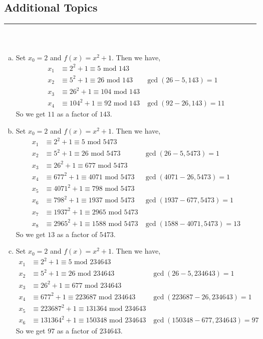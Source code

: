 \documentclass[class=article, crop=false]{standalone}
\begin{document}
\setcounter{subsection}{11}
\subsection{Additional Topics}
\rule{\textwidth}{1pt}\\
\subsubsection{}
\begin{enumerate}[(a)]
  \item
    Set $x_0 = 2$ and $f(x) =x^2+1$. Then we have,
    \begin{align*}
      x_1 &\equiv 2^2 + 1\equiv 5\mbox{ mod }143 \\
      x_2 &\equiv 5^2 + 1\equiv 26\mbox{ mod }143 &\gcd(26-5, 143)=1\\
      x_3 &\equiv 26^2 + 1\equiv 104\mbox{ mod }143 \\
      x_4 &\equiv 104^2 + 1\equiv 92\mbox{ mod }143 &\gcd(92-26, 143)=11
    \end{align*}
    So we get $11$ as a factor of $143$.

  \item
    Set $x_0=2$ and $f(x) = x^2+1$. Then we have,
    \begin{align*}
      x_1 &\equiv 2^2 + 1\equiv 5\mbox{ mod }5473 \\
      x_2 &\equiv 5^2 + 1\equiv 26\mbox{ mod }5473 &\gcd(26-5, 5473)=1\\
      x_3 &\equiv 26^2 + 1\equiv 677\mbox{ mod }5473 \\
      x_4 &\equiv 677^2 + 1\equiv 4071\mbox{ mod }5473 &\gcd(4071-26, 5473)=1\\
      x_5 &\equiv 4071^2 + 1\equiv 798\mbox{ mod }5473 \\
      x_6 &\equiv 798^2 + 1\equiv 1937\mbox{ mod }5473 &\gcd(1937-677, 5473)=1\\
      x_7 &\equiv 1937^2 + 1\equiv 2965\mbox{ mod }5473 \\
      x_8 &\equiv 2965^2 + 1\equiv 1588\mbox{ mod }5473 &\gcd(1588-4071, 5473)=13
    \end{align*}
    So we get $13$ as a factor of $5473$.

  \item
    Set $x_0=2$ and $f(x) = x^2+1$. Then we have,
    \begin{align*}
      x_1 &\equiv 2^2 + 1\equiv 5\mbox{ mod }234643 \\
      x_2 &\equiv 5^2 + 1\equiv 26\mbox{ mod }234643 &\gcd(26-5, 234643)=1\\
      x_3 &\equiv 26^2 + 1\equiv 677\mbox{ mod }234643 \\
      x_4 &\equiv 677^2 + 1\equiv 223687\mbox{ mod }234643 &\gcd(223687-26, 234643)=1\\
      x_5 &\equiv 223687^2 + 1\equiv 131364\mbox{ mod }234643 \\
      x_6 &\equiv 131364^2 + 1\equiv 150348\mbox{ mod }234643 &\gcd(150348-677, 234643)=97
    \end{align*}
    So we get $97$ as a factor of $234643$.
\end{enumerate}
\end{document}
